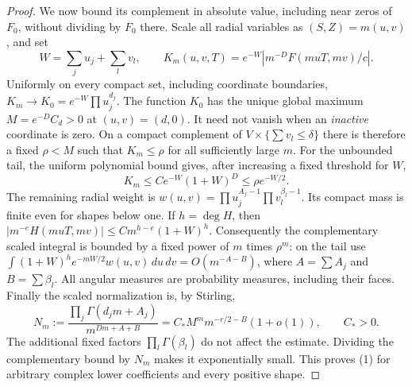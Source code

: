 \documentclass[11pt]{article}
\begin{document}
\begin{proof}
We now bound its complement in absolute value, including near zeros
of $F_0$, without dividing by $F_0$ there. Scale all radial variables
as $(S,Z)=m(u,v)$, and set
\[
 W=\sum_j u_j+\sum_l v_l,\qquad
 K_m(u,v,T)=e^{-W}|m^{-D}F(muT,mv)/c|.
\]
Uniformly on every compact set, including coordinate boundaries,
$K_m\to K_0=e^{-W}\prod u_j^{d_j}$.
The function $K_0$ has the unique global maximum
$M=e^{-D}C_d>0$ at $(u,v)=(d,0)$. It need not vanish when an
\emph{inactive} coordinate is zero. On a compact complement of
$V\times\{\sum v_l\leq\delta\}$ there is therefore a fixed $\rho<M$
such that $K_m\leq\rho$ for all sufficiently large $m$.
For the unbounded tail, the uniform polynomial bound gives, after
increasing a fixed threshold for $W$,
\[
 K_m\leq C e^{-W}(1+W)^D\leq\rho e^{-W/2}.
\]
The remaining radial weight is
$w(u,v)=\prod u_j^{A_j-1}\prod v_l^{\beta_l-1}$.
Its compact mass is finite even for shapes below one. If $h=\deg H$,
then $|m^{-e}H(muT,mv)|\leq C m^{h-e}(1+W)^h$.
Consequently the complementary scaled integral is bounded by a fixed
power of $m$ times $\rho^m$: on the tail use
$\int(1+W)^h e^{-mW/2}w(u,v)\,du\,dv=O(m^{-A-B})$,
where $A=\sum A_j$ and $B=\sum\beta_l$.
All angular measures are probability measures, including their faces.
Finally the scaled normalization is, by Stirling,
\[
 N_m:=\frac{\prod_j\Gamma(d_jm+A_j)}{m^{Dm+A+B}}
   =C_* M^m m^{-r/2-B}(1+o(1)),\qquad C_*>0.
\]
The additional fixed factors $\prod_l\Gamma(\beta_l)$ do not affect
the estimate. Dividing the complementary bound by $N_m$ makes it
exponentially small. This proves (1) for arbitrary complex lower
coefficients and every positive shape.
\end{proof}
\end{document}
